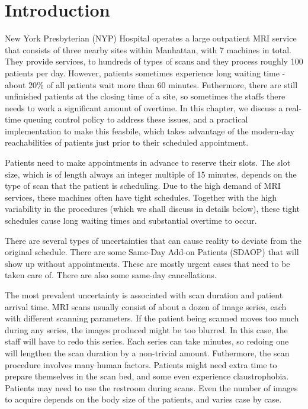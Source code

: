\section{Introduction}

New York Presbyterian (NYP) Hospital operates a large outpatient MRI service that
consists of three nearby sites within Manhattan, with 7 machines in total.
They provide services, to hundreds of types of scans and they process roughly 100
patients per day. However, patients sometimes experience long waiting time
-about 20\% of all patients wait more than 60 minutes. Futhermore, there are
still unfinished patients at the closing time of a site,
so sometimes the staffs there needs to work a significant amount of overtime. In this chapter,
we discuss a real-time queuing control policy to address these issues,
and a practical implementation to make this feasbile, which takes advantage
of the modern-day reachabilities of patients just prior to their scheduled
appointment.

Patients need to make appointments in advance to reserve their slots.
The slot size, which is of length always an integer multiple of 15 minutes,
depends on the type of scan that the patient is scheduling.
Due to the high demand of MRI services, these machines often have tight
schedules. Together with the high variability in the procedures (which we
shall discuss in details below), these tight schedules cause long waiting times
and substantial overtime to occur.

There are several types of uncertainties that can cause reality to
deviate from the original schedule. There are some Same-Day Add-on Patients (SDAOP)
that will show up without appointments. These are mostly urgent cases
that need to be taken care of. There are also some same-day cancellations.

The most prevalent uncertainty is associated with scan duration and
patient arrival time. MRI scans usually consist of about a dozen of
image series, each with different scanning parameters. If the patient
being scanned moves too much during any series, the images produced
might be too blurred. In this case, the staff will have to redo this series.
Each series can take minutes, so redoing one will lengthen the scan
duration by a non-trivial amount. Futhermore, the scan procedure involves
many human factors. Patients might need extra time to prepare themselves
in the scan bed, and some even experience claustrophobia. Patients may need to
use the restroom during scans. Even the number of images to acquire depends
on the body size of the patients, and varies case by case.

